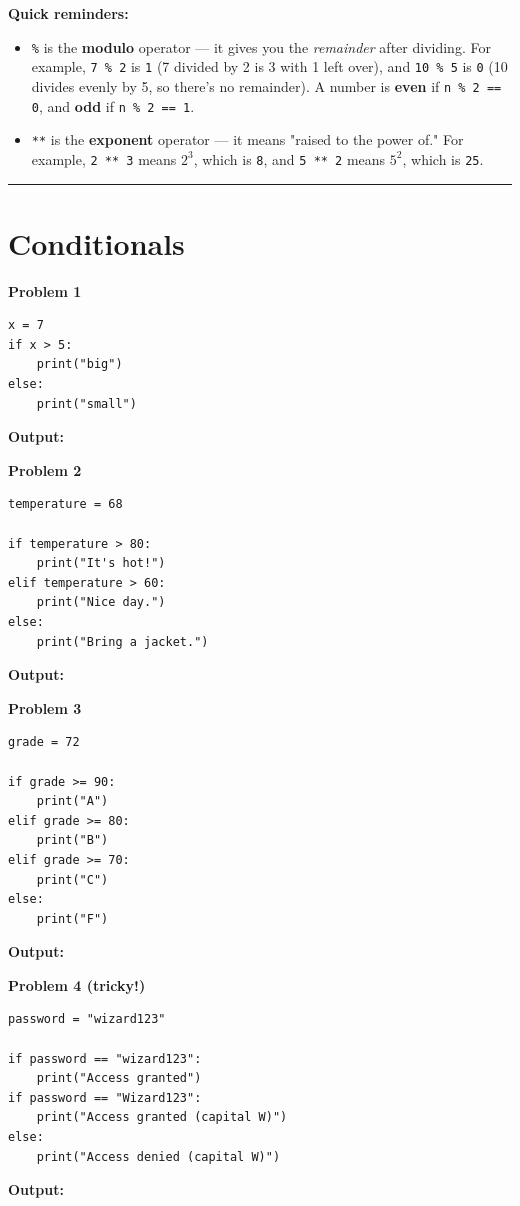 \documentclass[11pt]{article}
\newcommand{\answerbox}{%
\vspace{2mm}
\noindent\textbf{Output:}
\vspace{14mm}
}
\begin{document}
\noindent\textbf{Quick reminders:}
\vspace{2mm}

\begin{itemize}[nosep]
    \item \texttt{\%} is the \textbf{modulo} operator --- it gives you the \textit{remainder} after
    dividing. For example, \texttt{7 \% 2} is \texttt{1} (7 divided by 2 is 3 with 1 left over), and
    \texttt{10 \% 5} is \texttt{0} (10 divides evenly by 5, so there's no remainder). A number is
    \textbf{even} if \texttt{n \% 2 == 0}, and \textbf{odd} if \texttt{n \% 2 == 1}.
    \item \texttt{**} is the \textbf{exponent} operator --- it means "raised to the power of."
    For example, \texttt{2 ** 3} means $2^3$, which is \texttt{8}, and \texttt{5 ** 2} means
    $5^2$, which is \texttt{25}.
\end{itemize}

\vspace{2mm}
\hrule
\vspace{2mm}

\section{Conditionals}

\vspace{4mm}
\noindent\textbf{Problem 1}
\begin{lstlisting}
x = 7
if x > 5:
    print("big")
else:
    print("small")
\end{lstlisting}
\answerbox

\vspace{4mm}
\noindent\textbf{Problem 2}
\begin{lstlisting}
temperature = 68

if temperature > 80:
    print("It's hot!")
elif temperature > 60:
    print("Nice day.")
else:
    print("Bring a jacket.")
\end{lstlisting}
\answerbox

\vspace{4mm}
\noindent\textbf{Problem 3}
\begin{lstlisting}
grade = 72

if grade >= 90:
    print("A")
elif grade >= 80:
    print("B")
elif grade >= 70:
    print("C")
else:
    print("F")
\end{lstlisting}
\answerbox

\vspace{4mm}
\noindent\textbf{Problem 4 (tricky!)}
\begin{lstlisting}
password = "wizard123"

if password == "wizard123":
    print("Access granted")
if password == "Wizard123":
    print("Access granted (capital W)")
else:
    print("Access denied (capital W)")
\end{lstlisting}
\answerbox
\end{document}
